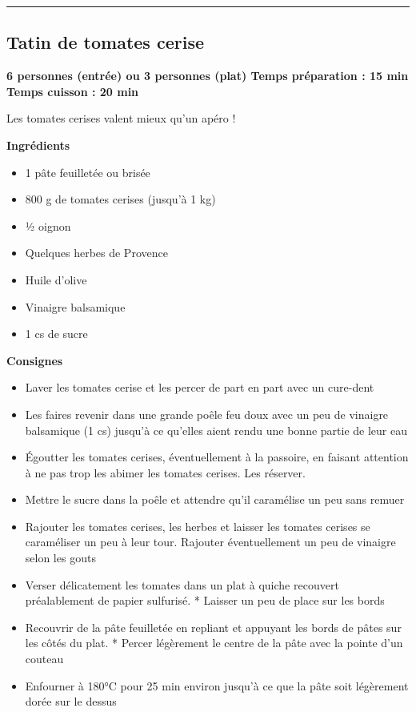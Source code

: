 \documentclass[]{book}
\providecommand{\tightlist}{%
  \setlength{\itemsep}{0pt}\setlength{\parskip}{0pt}}
\begin{document}
\begin{center}\rule{0.5\linewidth}{0.5pt}\end{center}

\hypertarget{tatin-de-tomates-cerise}{%
\subsection*{\texorpdfstring{{Tatin de tomates cerise}}{Tatin de tomates cerise}}\label{tatin-de-tomates-cerise}}

\begin{salebox}
\textbf{6 personnes (entrée) ou 3 personnes (plat) \textbar{} Temps
préparation : 15 min \textbar{} Temps cuisson : 20 min}

Les tomates cerises valent mieux qu'un apéro !
\end{salebox}

\textbf{Ingrédients}

\begin{itemize}
\tightlist
\item
  1 pâte feuilletée ou brisée
\item
  800 g de tomates cerises (jusqu'à 1 kg)
\item
  ½ oignon
\item
  Quelques herbes de Provence
\item
  Huile d'olive
\item
  Vinaigre balsamique
\item
  1 cs de sucre
\end{itemize}

\textbf{Consignes}

\begin{itemize}
\tightlist
\item
  Laver les tomates cerise et les percer de part en part avec un cure-dent
\item
  Les faires revenir dans une grande poêle feu doux avec un peu de vinaigre balsamique (1 cs) jusqu'à ce qu'elles aient rendu une bonne partie de leur eau
\item
  Égoutter les tomates cerises, éventuellement à la passoire, en faisant attention à ne pas trop les abimer les tomates cerises. Les réserver.
\item
  Mettre le sucre dans la poêle et attendre qu'il caramélise un peu sans remuer
\item
  Rajouter les tomates cerises, les herbes et laisser les tomates cerises se caraméliser un peu à leur tour. Rajouter éventuellement un peu de vinaigre selon les gouts
\item
  Verser délicatement les tomates dans un plat à quiche recouvert préalablement de papier sulfurisé. * Laisser un peu de place sur les bords
\item
  Recouvrir de la pâte feuilletée en repliant et appuyant les bords de pâtes sur les côtés du plat. * Percer légèrement le centre de la pâte avec la pointe d'un couteau
\item
  Enfourner à 180°C pour 25 min environ jusqu'à ce que la pâte soit légèrement dorée sur le dessus
\end{itemize}
\end{document}
